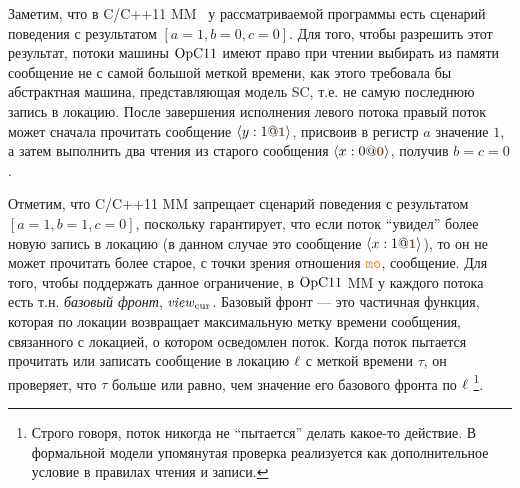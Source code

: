 Заметим, что в C/C++11 MM~\cite{Batty-al:POPL11} у рассматриваемой программы есть сценарий поведения
с результатом $[a = 1, b = 0, c = 0]$.
Для того, чтобы разрешить этот результат,
потоки машины $\mathrm{OpC11}$ имеют право при чтении выбирать из памяти
сообщение не с самой большой меткой времени,
как этого требовала бы абстрактная машина, представляющая модель SC, т.е.
не самую последнюю запись в локацию.
После завершения исполнения левого потока
правый поток может сначала прочитать сообщение $\angled{y:1@\tstamp{1}}$,
присвоив в регистр $a$ значение $1$,
а затем выполнить два чтения из старого сообщения $\angled{x:0@\tstamp{0}}$,
получив $b = c = 0$.

Отметим, что C/C++11 MM запрещает сценарий поведения с результатом
$[a = 1, b = 1, c = 0]$, поскольку гарантирует, что если поток
``увидел'' более новую запись в локацию
(в данном случае это сообщение $\angled{x:1@\tstamp{1}}$),
то он не может прочитать более старое, с точки зрения отношения $\lMO$, сообщение.
Для того, чтобы поддержать данное ограничение, в $\mathrm{OpC11}$ MM у каждого потока есть
т.н. \emph{базовый фронт}, $\mathit{view}_{\mathrm{cur}}$.
Базовый фронт --- это частичная функция, которая по локации возвращает
максимальную метку времени сообщения, связанного с локацией,
о котором осведомлен поток.
Когда поток пытается прочитать или записать сообщение в локацию $\ell$ с меткой времени $\tau$,
он проверяет, что $\tau$ больше или равно, чем значение его базового фронта по
$\ell$%
\footnote{
Строго говоря, поток никогда не ``пытается'' делать какое-то действие.
В формальной модели упомянутая проверка реализуется как дополнительное условие в
правилах чтения и записи.
}.

